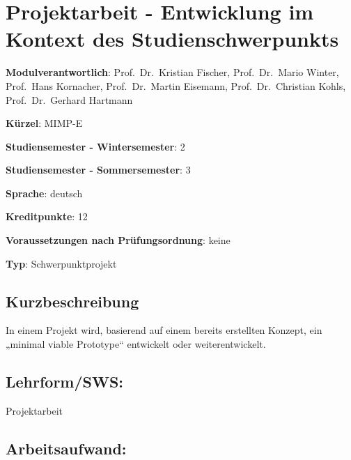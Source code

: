\chapter{Projektarbeit - Entwicklung im Kontext des
Studienschwerpunkts}\label{projektarbeit---entwicklung-im-kontext-des-studienschwerpunkts}

\begin{modulHead}
\textbf{Modulverantwortlich}: Prof.~Dr.~Kristian
Fischer, Prof.~Dr.~Mario Winter, Prof.~Hans Kornacher, Prof.~Dr.~Martin
Eisemann, Prof.~Dr.~Christian Kohls, Prof.~Dr.~Gerhard
Hartmann
\end{modulHead}
\begin{modulHead}
\textbf{Kürzel}:
MIMP-E
\end{modulHead}
\begin{modulHead}
\textbf{Studiensemester -
Wintersemester}:
2
\end{modulHead}
\begin{modulHead}
\textbf{Studiensemester -
Sommersemester}: 3
\end{modulHead}
\begin{modulHead}
\textbf{Sprache}:
deutsch
\end{modulHead}
\begin{modulHead}
\textbf{Kreditpunkte}:
12
\end{modulHead}
\begin{modulHead}
\textbf{Voraussetzungen nach
Prüfungsordnung}: keine
\end{modulHead}
\begin{modulHead}
\textbf{Typ}:
Schwerpunktprojekt
\end{modulHead}


\section*{Kurzbeschreibung}\label{kurzbeschreibung-7}

In einem Projekt wird, basierend auf einem bereits erstellten Konzept,
ein „minimal viable Prototype`` entwickelt oder weiterentwickelt.

\section*{Lehrform/SWS:}\label{lehrformsws-9}

Projektarbeit

\section*{Arbeitsaufwand:}\label{arbeitsaufwand-14}

